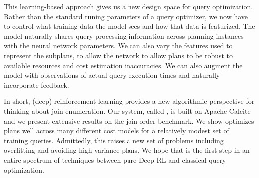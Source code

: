 This learning-based approach gives us a new design space for query optimization.
Rather than the standard tuning parameters of a query optimizer, we now have to control what training data the model sees and how that data is featurized.
The model naturally shares query processing information across planning instances with the neural network parameters.
We can also vary the features used to represent the subplans, to allow the network to allow plans to be robust to available resources and cost estimation inaccuracies.
We can also augment the model with observations of actual query execution times and naturally incorporate feedback.

In short, (deep) reinforcement learning provides a new algorithmic perspective for thinking about join enumeration. 
Our system, called \sys, is built on Apache Calcite and we present extensive results on the join order benchmark.
We show \sys optimizes plans well across many different cost models for a relatively modest set of training queries.
Admittedly, this raises a new set of problems including overfitting and avoiding high-variance plans.
We hope that \sys is the first step in an entire spectrum of techniques between pure Deep RL and classical query optimization.

 

